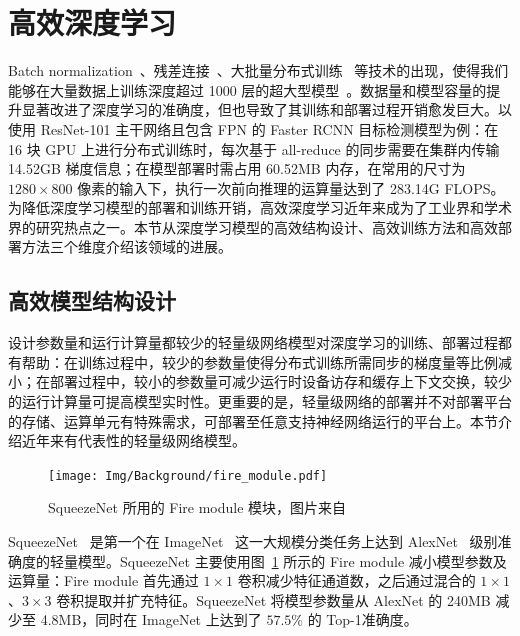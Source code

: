 \section{高效深度学习}
Batch normalization~\citep{ioffe2015batch}、残差连接~\citep{He_2016}、大批量分布式训练~\citep{goyal2017accurate} 等技术的出现，使得我们能够在大量数据上训练深度超过 1000 层的超大型模型~\citep{He_2016}。数据量和模型容量的提升显著改进了深度学习的准确度，但也导致了其训练和部署过程开销愈发巨大。以使用 ResNet-101 主干网络且包含 FPN 的 Faster RCNN 目标检测模型为例：在 16 块 GPU 上进行分布式训练时，每次基于 all-reduce 的同步需要在集群内传输 14.52GB 梯度信息；在模型部署时需占用 60.52MB 内存，在常用的尺寸为 $1280 \times 800$ 像素的输入下，执行一次前向推理的运算量达到了 283.14G FLOPS。为降低深度学习模型的部署和训练开销，高效深度学习近年来成为了工业界和学术界的研究热点之一。本节从深度学习模型的高效结构设计、高效训练方法和高效部署方法三个维度介绍该领域的进展。
\subsection{高效模型结构设计}
设计参数量和运行计算量都较少的轻量级网络模型对深度学习的训练、部署过程都有帮助：在训练过程中，较少的参数量使得分布式训练所需同步的梯度量等比例减小；在部署过程中，较小的参数量可减少运行时设备访存和缓存上下文交换，较少的运行计算量可提高模型实时性。更重要的是，轻量级网络的部署并不对部署平台的存储、运算单元有特殊需求，可部署至任意支持神经网络运行的平台上。本节介绍近年来有代表性的轻量级网络模型。

\begin{figure}[htb]
  \centering
  \texttt{[image: Img/Background/fire\_module.pdf]}
  \caption{SqueezeNet 所用的 Fire module 模块，图片来自~\citet{iandola2016squeezenet}}
  \label{img::background::fire_module}
\end{figure}

SqueezeNet~\citep{iandola2016squeezenet} 是第一个在 ImageNet~\citep{krizhevsky2012imagenet} 这一大规模分类任务上达到 AlexNet~\citep{krizhevsky2012imagenet} 级别准确度的轻量模型。SqueezeNet 主要使用图~\ref{img::background::fire_module} 所示的 Fire module 减小模型参数及运算量：Fire module 首先通过 $1\times 1$ 卷积减少特征通道数，之后通过混合的 $1\times 1$、$3\times 3$ 卷积提取并扩充特征。SqueezeNet 将模型参数量从 AlexNet 的 240MB 减少至 4.8MB，同时在 ImageNet 上达到了 $57.5\%$ 的 Top-1准确度。

